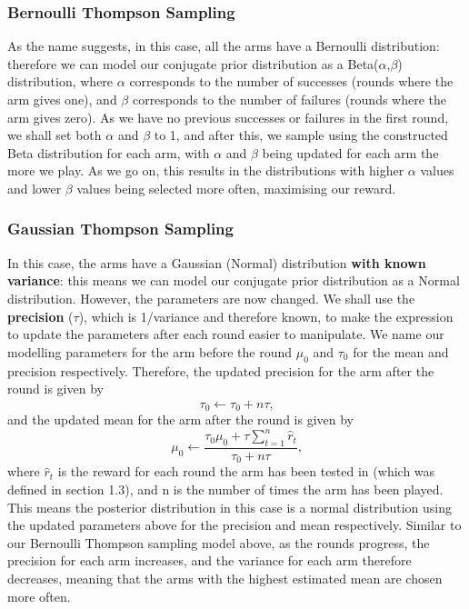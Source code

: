     \subsubsection{Bernoulli Thompson Sampling}
    As the name suggests, in this case, all the arms have a Bernoulli distribution: therefore we can model our conjugate prior distribution as a Beta($\alpha$,$\beta$) distribution, where $\alpha$ corresponds to the number of successes (rounds where the arm gives one), and $\beta$ corresponds to the number of failures (rounds where the arm gives zero). As we have no previous successes or failures in the first round, we shall set both $\alpha$ and $\beta$ to 1, and after this, we sample using the constructed Beta distribution for each arm, with $\alpha$ and $\beta$ being updated for each arm the more we play. As we go on, this results in the distributions with higher $\alpha$ values and lower $\beta$ values being selected more often, maximising our reward.

    \subsubsection{Gaussian Thompson Sampling}
    In this case, the arms have a Gaussian (Normal) distribution \textbf{with known variance}: this means we can model our conjugate prior distribution as a Normal distribution.
    However, the parameters are now changed.
    We shall use the \textbf{precision} ($\tau$), which is 1/variance and therefore known, to make the expression to update the parameters after each round easier to manipulate.
    We name our modelling parameters for the arm before the round $\mu_0$ and $\tau_0$ for the mean and precision respectively.
    Therefore, the updated precision for the arm after the round is given by
    \[\tau_0\xleftarrow{}\tau_0 + n\tau\text{,}\]
    and the updated mean for the arm after the round is given by
    \[\mu_0\xleftarrow{}\frac{\tau_0\mu_0 + \tau\sum_{t=1}^n\widehat{r}_t}{\tau_0 + n\tau}\text{,}\]
    where $\widehat{r}_t$ is the reward for each round the arm has been tested in \citep{agrawal2013further} (which was defined in section 1.3), and n is the number of times the arm has been played. This means the posterior distribution in this case is a normal distribution using the updated parameters above for the precision and mean respectively.
    Similar to our Bernoulli Thompson sampling model above, as the rounds progress, the precision for each arm increases, and the variance for each arm therefore decreases, meaning that the arms with the highest estimated mean are chosen more often.


